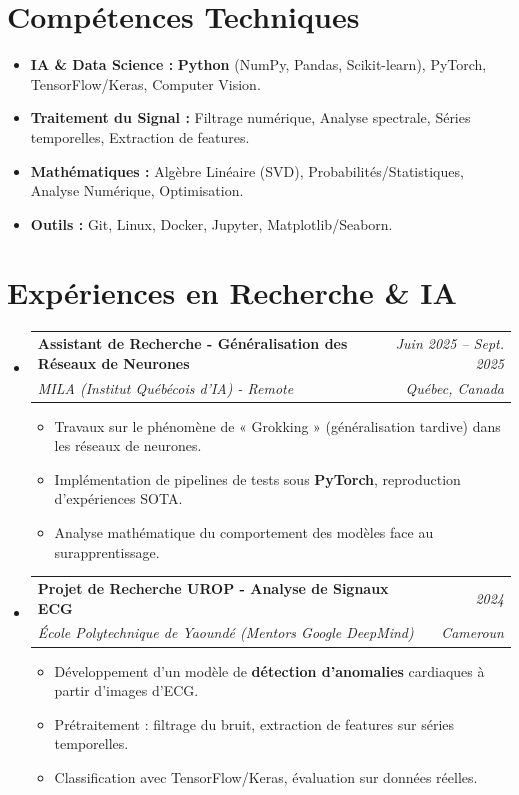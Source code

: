 \documentclass[a4paper,11pt]{article}
\makeatletter
\newcommand{\resumeSubheading}[4]{
  \vspace{-1pt}\item
    \begin{tabular*}{0.97\textwidth}[t]{l@{\extracolsep{\fill}}r}
      \textbf{#1} & \textit{\small #2} \\
      \textit{\small #3} & \textit{\small #4} \\
    \end{tabular*}\vspace{-5pt}
}
\makeatother
\begin{document}
\section{Compétences Techniques}
\begin{itemize}[leftmargin=*, nosep]
    \item \small{\textbf{IA \& Data Science :} \textbf{Python} (NumPy, Pandas, Scikit-learn), PyTorch, TensorFlow/Keras, Computer Vision.}
    \item \small{\textbf{Traitement du Signal :} Filtrage numérique, Analyse spectrale, Séries temporelles, Extraction de features.}
    \item \small{\textbf{Mathématiques :} Algèbre Linéaire (SVD), Probabilités/Statistiques, Analyse Numérique, Optimisation.}
    \item \small{\textbf{Outils :} Git, Linux, Docker, Jupyter, Matplotlib/Seaborn.}
\end{itemize}

\section{Expériences en Recherche \& IA}
\begin{itemize}[leftmargin=*, label={-}]

    \resumeSubheading
      {Assistant de Recherche - Généralisation des Réseaux de Neurones}{Juin 2025 -- Sept. 2025}
      {MILA (Institut Québécois d'IA) - Remote}{Québec, Canada}
      \begin{itemize}[leftmargin=0.4cm, nosep, label=\tiny$\bullet$]
        \item \small{Travaux sur le phénomène de « Grokking » (généralisation tardive) dans les réseaux de neurones.}
        \item \small{Implémentation de pipelines de tests sous \textbf{PyTorch}, reproduction d'expériences SOTA.}
        \item \small{Analyse mathématique du comportement des modèles face au surapprentissage.}
      \end{itemize}
    \vspace{2pt}

    \resumeSubheading
      {Projet de Recherche UROP - Analyse de Signaux ECG}{2024}
      {École Polytechnique de Yaoundé (Mentors Google DeepMind)}{Cameroun}
      \begin{itemize}[leftmargin=0.4cm, nosep, label=\tiny$\bullet$]
        \item \small{Développement d'un modèle de \textbf{détection d'anomalies} cardiaques à partir d'images d'ECG.}
        \item \small{Prétraitement : filtrage du bruit, extraction de features sur séries temporelles.}
        \item \small{Classification avec TensorFlow/Keras, évaluation sur données réelles.}
      \end{itemize}

\end{itemize}
\end{document}
